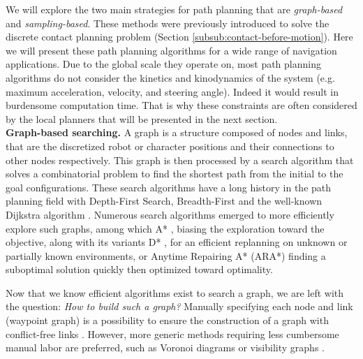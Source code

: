 We will explore the two main strategies for path planning that are \textit{graph-based} and \textit{sampling-based}.
These methods were previously introduced to solve the discrete contact planning problem (Section \ref{subsub:contact-before-motion}).
Here we will present these path planning algorithms for a wide range of navigation applications.
Due to the global scale they operate on, most path planning algorithms do not consider the kinetics and kinodynamics of the system (e.g. maximum acceleration, velocity, and steering angle). 
Indeed it would result in burdensome computation time. 
That is why these constraints are often considered by the local planners that will be presented in the next section.\\

\noindent\textbf{Graph-based searching.}
A graph is a structure composed of nodes and links, that are the discretized robot or character positions and their connections to other nodes respectively.
This graph is then processed by a search algorithm that solves a combinatorial problem to find the shortest path from the initial to the goal configurations. 
These search algorithms have a long history in the path planning field with Depth-First Search, Breadth-First and the well-known Dijkstra algorithm \cite{dijkstra_1959}. 
Numerous search algorithms emerged to more efficiently explore such graphs, among which A* \cite{A_star_1968}, biasing the exploration toward the objective, along with its variants D* \cite{D_star_1994}, for an efficient replanning on unknown or partially known environments, or Anytime Repairing A* (ARA*) \cite{ara_star_2003} finding a suboptimal solution quickly then optimized toward optimality.

Now that we know efficient algorithms exist to search a graph, we are left with the question: \textit{How to build such a graph?}
Manually specifying each node and link (waypoint graph) is a possibility to ensure the construction of a graph with conflict-free links \cite{waypoints_graph_lars_2002}.%
However, more generic methods requiring less cumbersome manual labor are preferred, such as Voronoi diagrams \cite{voronoi_example_2007} or visibility graphs \cite{visiblity_graph_example_2004}. \\

